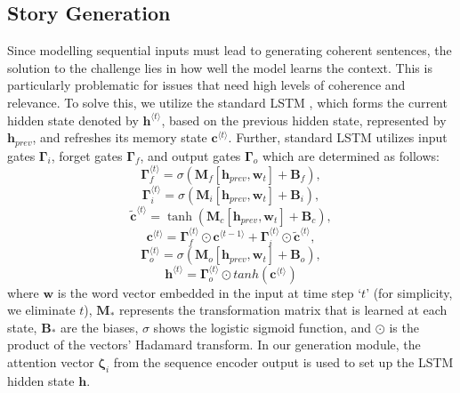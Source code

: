 \documentclass[runningheads]{llncs}
\begin{document}
\subsection{Story Generation}
Since modelling sequential inputs must lead to generating coherent sentences, the solution to the challenge lies in how well the model learns the context. This is particularly problematic for issues that need high levels of coherence and relevance. To solve this, we utilize the standard LSTM \cite{hochreiter1997long}, which forms the current hidden state denoted by $\boldsymbol h^{\langle t \rangle}$, based on the previous hidden state, represented by $\boldsymbol h_{prev}$, and refreshes its memory state $\boldsymbol c^{\langle t \rangle}$. Further, standard LSTM utilizes input gates $\boldsymbol \Gamma_i$, forget gates $\boldsymbol \Gamma_f$, and output gates $\boldsymbol \Gamma_o$ which are determined as follows:
\begin{equation}
\boldsymbol \Gamma_f^{\langle t \rangle} = \sigma(\boldsymbol M_f[\boldsymbol h_{prev}, \boldsymbol w_{t}] + \boldsymbol B_f),
\end{equation}
\begin{equation}
\boldsymbol \Gamma_i^{\langle t \rangle} = \sigma(\boldsymbol M_i[\boldsymbol h_{prev}, \boldsymbol w_{t}] + \boldsymbol B_i),
\end{equation}
\begin{equation}
\boldsymbol {\tilde c}^{\langle t \rangle} = \tanh{(\boldsymbol M_c[\boldsymbol h_{prev},  \boldsymbol w_{t}] + \boldsymbol B_c)},
\end{equation}
\begin{equation}
\boldsymbol c^{\langle t \rangle} = \boldsymbol \Gamma_f^{\langle t \rangle} \odot \boldsymbol c^{\langle t-1 \rangle} + \boldsymbol \Gamma_i^{\langle t \rangle} \odot \boldsymbol {\tilde c}^{\langle t \rangle},
\end{equation}
\begin{equation}
\boldsymbol \Gamma_o^{\langle t \rangle} = \sigma(\boldsymbol M_o[\boldsymbol h_{prev}, \boldsymbol w_{t}] + \boldsymbol B_o),
\end{equation}
\begin{equation}
\boldsymbol h^{\langle t \rangle} = \boldsymbol \Gamma_o^{\langle t \rangle} \odot tanh(\boldsymbol c^{\langle t \rangle})
\end{equation}
where $\boldsymbol w$ is the word vector embedded in the input at time step `$t$' (for simplicity, we eliminate $t$), $\boldsymbol M_*$ represents the transformation matrix that is learned at each state, $\boldsymbol B_*$ are the biases, $\sigma$ shows the logistic sigmoid function, and $\odot$ is the product of the vectors' Hadamard transform. In our generation module, the attention vector $\boldsymbol \zeta_i$ from the sequence encoder output is used to set up the LSTM hidden state $\boldsymbol h$. 
\end{document}
